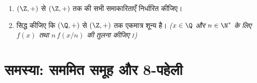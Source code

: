 \begin{exercise}[$\star\star$]\label{exo:b1:structures:12}
\begin{enumerate}
  \item $(\Z, +)$ से $(\Z, +)$ तक की सभी  समाकारिताएँ निर्धारित कीजिए।
  \item सिद्ध कीजिए कि $(\Q, +)$ से $(\Z, +)$ तक एकमात्र  
  शून्य  है। \emph{($x \in \Q$ और $n \in \N^*$ के लिए $f(x)$ तथा
  $n\,f(x/n)$ की तुलना कीजिए।)}
\end{enumerate}
\end{exercise}

\section{समस्या: सममित समूह और 8-पहेली}

